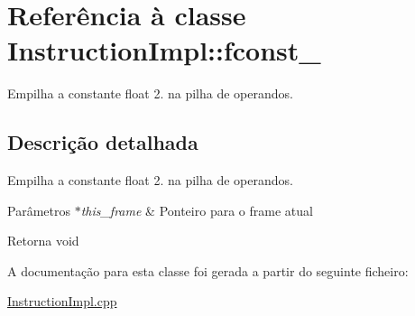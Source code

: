 \hypertarget{class_instruction_impl_1_1fconst__2}{}\section{Referência à classe Instruction\+Impl\+:\+:fconst\+\_}
\label{class_instruction_impl_1_1fconst__2}


Empilha a constante float 2. na pilha de operandos.  




\subsection{Descrição detalhada}
Empilha a constante float 2. na pilha de operandos. 


\begin{DoxyParams}{Parâmetros}
{\em $\ast$this\+\_\+frame} & Ponteiro para o frame atual \\
\hline
\end{DoxyParams}
\begin{DoxyReturn}{Retorna}
void 
\end{DoxyReturn}


A documentação para esta classe foi gerada a partir do seguinte ficheiro\+:\begin{DoxyCompactItemize}
\item 
\hyperlink{_instruction_impl_8cpp}{Instruction\+Impl.\+cpp}\end{DoxyCompactItemize}
